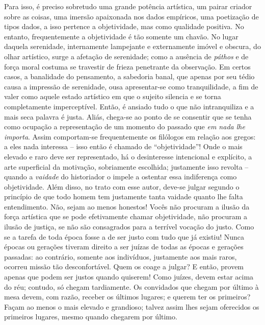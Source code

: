 Para isso, é preciso sobretudo uma grande potência artística, um pairar
criador sobre as coisas, uma imersão apaixonada nos dados empíricos, uma
poetização de tipos dados, a isso pertence a objetividade, mas como
qualidade positiva. No entanto, frequentemente a objetividade é
tão somente um chavão. No lugar daquela serenidade, internamente
lampejante e externamente imóvel e obscura, do olhar artístico, surge a
afetação de serenidade; como a ausência de \emph{páthos} e de força
moral costuma se travestir de frieza penetrante da observação. Em certos
casos, a banalidade do pensamento, a sabedoria banal, que apenas por seu
tédio causa a impressão de serenidade, ousa apresentar-se como
tranquilidade, a fim de valer como aquele estado artístico em que o
sujeito silencia e se torna completamente imperceptível. Então, é ansiado
tudo o que não intranquiliza e a mais seca palavra é justa. Aliás,
chega-se ao ponto de se consentir que se tenha como ocupação a
representação de um momento do passado que \emph{em nada lhe importa}.
Assim comportam-se frequentemente os filólogos em relação aos gregos: a
eles nada interessa -- isso então é chamado de ``objetividade''! Onde o
mais elevado e raro deve ser representado, há o desinteresse intencional
e explícito, a arte superficial da motivação, sobriamente escolhida;
justamente isso revolta -- quando a \emph{vaidade} do historiador o
impele a ostentar essa indiferença como objetividade. Além disso, no
trato com esse autor, deve-se julgar segundo o princípio de que todo
homem tem justamente tanta vaidade quanto lhe falta entendimento. Não,
sejam ao menos honestos! Vocês não procuram a ilusão da força artística
que se pode efetivamente chamar objetividade, não procuram a ilusão de
justiça, se não são consagrados para a terrível vocação do justo. Como
se a tarefa de toda época fosse a de ser justo com tudo que já existiu!
Nunca épocas ou gerações tiveram direito a ser juízas de todas as épocas
e gerações passadas: ao contrário, somente aos indivíduos, justamente
aos mais raros, ocorreu missão tão desconfortável. Quem os coage a
julgar? E então, provem apenas que podem ser justos quando quiserem!
Como juízes, devem estar acima do réu; contudo, só chegam tardiamente.
Os convidados que chegam por último à mesa devem, com razão, receber os
últimos lugares; e querem ter os primeiros? Façam ao menos o mais
elevado e grandioso; talvez assim lhes sejam oferecidos os primeiros
lugares, mesmo quando chegarem por último.

